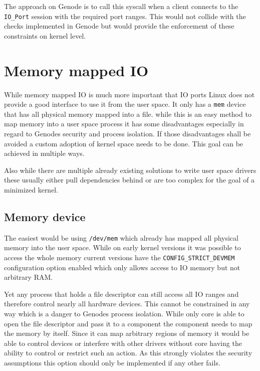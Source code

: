 \documentclass[
a4paper,
12pt,
notitlepage,
parskip=half,
DIV=11,
]{scrbook}
\begin{document}
		The approach on Genode is to call this syscall when a client connects to the \texttt{IO\_Port} session with the required port ranges.
		This would not collide with the checks implemented in Genode but would provide the enforcement of these constraints on kernel level.
		
		\section{Memory mapped IO}
		
		While memory mapped IO is much more important that IO ports Linux does not provide a good interface to use it from the user space.
		It only has a \texttt{mem} device that has all physical memory mapped into a file.
		while this is an easy method to map memory into a user space process it has some disadvantages especially in regard to Genodes security and process isolation.
		If those disadvantages shall be avoided a custom adoption of kernel space needs to be done.
		This goal can be achieved in multiple ways.
		
		Also while there are multiple already existing solutions to write user space drivers these usually either pull dependencies behind or are too complex for the goal of a minimized kernel.
		
		\subsection{Memory device}
		
		The easiest would be using \texttt{/dev/mem} which already has mapped all physical memory into the user space.
		While on early kernel versions it was possible to access the whole memory current versions have the \texttt{CONFIG\_STRICT\_DEVMEM} configuration option enabled which only allows access to IO memory but not arbitrary RAM.
		
		Yet any process that holds a file descriptor can still access all IO ranges and therefore control nearly all hardware devices.
		This cannot be constrained in any way which is a danger to Genodes process isolation.
		While only core is able to open the file descriptor and pass it to a component the component needs to map the memory by itself.
		Since it can map arbitrary regions of memory it would be able to control devices or interfere with other drivers without core having the ability to control or restrict such an action.
		As this strongly violates the security assumptions this option should only be implemented if any other fails. \citep{devmem} 
		
\end{document}
